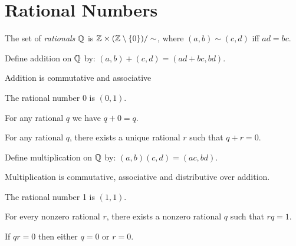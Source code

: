 \chapter{Rational Numbers}

\begin{definition}
    The set of \emph{rationals} $\mathbb{Q}$ is $\mathbb{Z} \times (\mathbb{Z} \setminus \{0\}) / \sim$, where
    $(a,b) \sim (c,d)$ iff $ad = bc$.
\end{definition}

\begin{definition}[Addition]
    Define addition on $\mathbb{Q}$ by: $(a,b) + (c,d) = (ad+bc,bd)$.
\end{definition}

\begin{theorem}
    Addition is commutative and associative
\end{theorem}

\begin{definition}
    The rational number 0 is $(0,1)$.
\end{definition}

\begin{theorem}
    For any rational $q$ we have $q + 0 = q$.
\end{theorem}

\begin{theorem}
    For any rational $q$, there exists a unique rational $r$ such that $q + r = 0$.
\end{theorem}

\begin{definition}
    Define multiplication on $\mathbb{Q}$ by: $(a,b)(c,d) = (ac,bd)$.
\end{definition}

\begin{theorem}
    Multiplication is commutative, associative and distributive over addition.
\end{theorem}

\begin{definition}
    The rational number 1 is $(1,1)$.
\end{definition}

\begin{theorem}
    For every nonzero rational $r$, there exists a nonzero rational $q$ such that $rq = 1$.
\end{theorem}

\begin{corollary}
    If $qr = 0$ then either $q = 0$ or $r = 0$.
\end{corollary}


